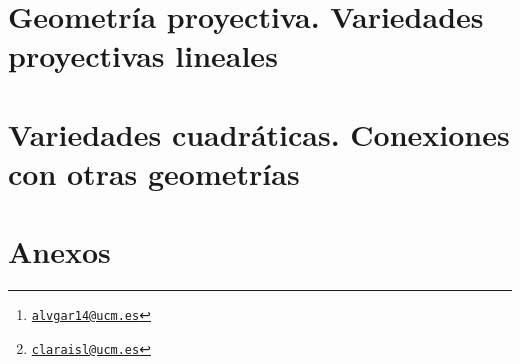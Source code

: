 \documentclass[a4paper, 10pt, twoside, titlepage, openright, onecolumn, final]{book}
\title{\tb{Geometría Lineal}}
\author{Álvaro García Tenorio
	\thanks{\texttt{\url{alvgar14@ucm.es}}}\and
	Clara Isabel López González
	\thanks{\texttt{\url{claraisl@ucm.es}}}}
\date{\today}
\begin{document}
	\maketitle
	\tableofcontents
	
	\part{Geometría proyectiva. Variedades proyectivas lineales}
	
	
	
	
	
	
	
	\part{Variedades cuadráticas. Conexiones con otras geometrías}
	
	
	\part{Anexos}
	\appendix
	
	\printindex[general]
	\nocite{*}
\end{document}
